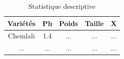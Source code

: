 \documentclass[12pt,french]{thesis}
\begin{document}
\begin{table}[]
    \centering
    \begin{tabular}{|c||c|c|c|c|}
    \hline
        Variétés & Ph & Poids& Taille& X \\ \hline
        Chemlali & 1.4 & ... & ... &... \\ \hline
        ... & ... & ... &...  &... \\ \hline
    \end{tabular}
    \caption{Statistique descriptive}
    \label{tab:my_label}
\end{table}





 
\end{document}
